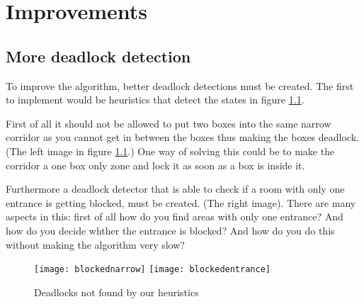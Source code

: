 
\chapter{Improvements}
\section{More deadlock detection}
To improve the algorithm, better deadlock detections must be created. The first to implement would be heuristics that detect the states in figure \ref{fig:missingdeadlocks}.

First of all it should not be allowed to put two boxes into the same narrow corridor as you cannot get in between the boxes thus making the boxes deadlock. (The left image in figure \ref{fig:missingdeadlocks}.) One way of solving this could be to make the corridor a one box only zone and lock it as soon as a box is inside it.

Furthermore a deadlock detector that is able to check if a room with only one entrance is getting blocked, must be created. (The right image). There are many aspects in this: first of all how do you find areas with only one entrance? And how do you decide whther the entrance is blocked? And how do you do this without making the algorithm very slow?

\begin{figure}[htp]
	\centering
	\texttt{[image: blockednarrow]}
	\texttt{[image: blockedentrance]}
	\caption{Deadlocks not found by our heuristics}
	\label{fig:missingdeadlocks}
\end{figure}
